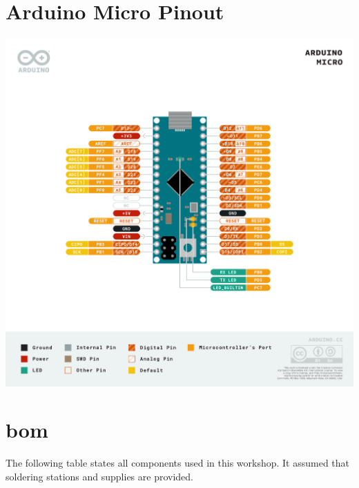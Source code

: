 
\chapter{Arduino Micro Pinout}\label{app:pinout}

\includegraphics[width=\textwidth]{graphics/appendix/arduino_pinout.png}


\chapter{\Acf{bom}}

The following table states all components used in this workshop. It assumed that soldering stations and supplies are provided.

